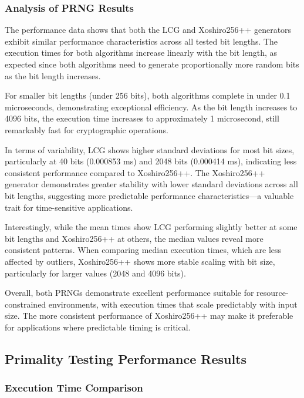 \subsubsection{Analysis of PRNG Results}

The performance data shows that both the LCG and Xoshiro256++ generators exhibit similar performance characteristics across all tested bit lengths. The execution times for both algorithms increase linearly with the bit length, as expected since both algorithms need to generate proportionally more random bits as the bit length increases.

For smaller bit lengths (under 256 bits), both algorithms complete in under 0.1 microseconds, demonstrating exceptional efficiency. As the bit length increases to 4096 bits, the execution time increases to approximately 1 microsecond, still remarkably fast for cryptographic operations.

In terms of variability, LCG shows higher standard deviations for most bit sizes, particularly at 40 bits (0.000853 ms) and 2048 bits (0.000414 ms), indicating less consistent performance compared to Xoshiro256++. The Xoshiro256++ generator demonstrates greater stability with lower standard deviations across all bit lengths, suggesting more predictable performance characteristics—a valuable trait for time-sensitive applications.

Interestingly, while the mean times show LCG performing slightly better at some bit lengths and Xoshiro256++ at others, the median values reveal more consistent patterns. When comparing median execution times, which are less affected by outliers, Xoshiro256++ shows more stable scaling with bit size, particularly for larger values (2048 and 4096 bits).

Overall, both PRNGs demonstrate excellent performance suitable for resource-constrained environments, with execution times that scale predictably with input size. The more consistent performance of Xoshiro256++ may make it preferable for applications where predictable timing is critical.

\subsection{Primality Testing Performance Results}

\subsubsection{Execution Time Comparison}


